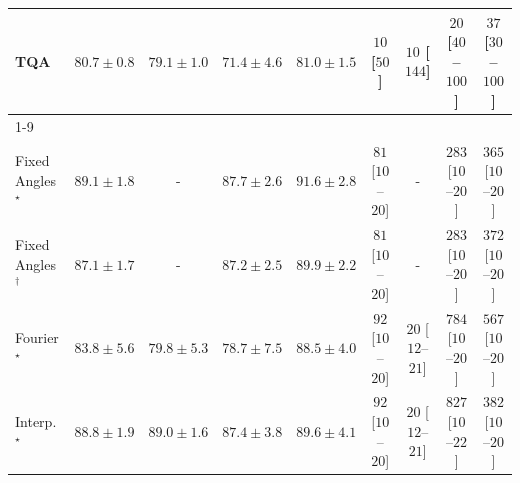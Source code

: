 \begin{tabular}{l|cccc|cccc|}
TQA & {\cellcolor[HTML]{2D914B}} \color[HTML]{F1F1F1} $80.7\pm 0.8$ & {\cellcolor[HTML]{379E54}} \color[HTML]{F1F1F1} $79.1\pm 1.0$ & {\cellcolor[HTML]{88CD7F}} \color[HTML]{000000} $71.4\pm 4.6$ & {\cellcolor[HTML]{2B8E4A}} \color[HTML]{F1F1F1} $81.0\pm 1.5$ & {\cellcolor[HTML]{FFF7F3}} \color[HTML]{000000} $10$ [$50$] & {\cellcolor[HTML]{FFF7F3}} \color[HTML]{000000} $10$ [$144$] & {\cellcolor[HTML]{FFF4F0}} \color[HTML]{000000} $20$ [$40$--$100$] & {\cellcolor[HTML]{FEF1ED}} \color[HTML]{000000} $37$ [$30$--$100$] \\
\cline{1-9}
\multicolumn{9}{c}{\rule{0pt}{8pt}SV} \\
\midrule
Fixed Angles$^\star$ & {\cellcolor[HTML]{034A74}} \color[HTML]{F1F1F1} $89.1\pm 1.8$ & {\cellcolor[HTML]{000000}} \color[HTML]{F1F1F1} {\cellcolor{white}} \color{black} - & {\cellcolor[HTML]{045483}} \color[HTML]{F1F1F1} $87.7\pm 2.6$ & {\cellcolor[HTML]{023858}} \color[HTML]{F1F1F1} $91.6\pm 2.8$ & {\cellcolor[HTML]{FEE6E3}} \color[HTML]{000000} $81$ [$10$--$20$] & {\cellcolor[HTML]{000000}} \color[HTML]{F1F1F1} {\cellcolor{white}} \color{black} - & {\cellcolor[HTML]{FBAAB8}} \color[HTML]{000000} $283$ [$10$--$20$] & {\cellcolor[HTML]{F984AB}} \color[HTML]{F1F1F1} $365$ [$10$--$20$] \\
Fixed Angles$^\dagger$ & {\cellcolor[HTML]{04588A}} \color[HTML]{F1F1F1} $87.1\pm 1.7$ & {\cellcolor[HTML]{000000}} \color[HTML]{F1F1F1} {\cellcolor{white}} \color{black} - & {\cellcolor[HTML]{04588A}} \color[HTML]{F1F1F1} $87.2\pm 2.5$ & {\cellcolor[HTML]{03446A}} \color[HTML]{F1F1F1} $89.9\pm 2.2$ & {\cellcolor[HTML]{FEE6E3}} \color[HTML]{000000} $81$ [$10$--$20$] & {\cellcolor[HTML]{000000}} \color[HTML]{F1F1F1} {\cellcolor{white}} \color{black} - & {\cellcolor[HTML]{FBAAB8}} \color[HTML]{000000} $283$ [$10$--$20$] & {\cellcolor[HTML]{F881AA}} \color[HTML]{F1F1F1} $372$ [$10$--$20$] \\
Fourier$^\star$ & {\cellcolor[HTML]{0569A4}} \color[HTML]{F1F1F1} $83.8\pm 5.6$ & {\cellcolor[HTML]{1E80B8}} \color[HTML]{F1F1F1} $79.8\pm 5.3$ & {\cellcolor[HTML]{2A88BC}} \color[HTML]{F1F1F1} $78.7\pm 7.5$ & {\cellcolor[HTML]{034E7B}} \color[HTML]{F1F1F1} $88.5\pm 4.0$ & {\cellcolor[HTML]{FDE4E1}} \color[HTML]{000000} $92$ [$10$--$20$] & {\cellcolor[HTML]{FFF4F0}} \color[HTML]{000000} $20$ [$12$--$21$] & {\cellcolor[HTML]{5D006F}} \color[HTML]{F1F1F1} $784$ [$10$--$20$] & {\cellcolor[HTML]{C71D8C}} \color[HTML]{F1F1F1} $567$ [$10$--$20$] \\
Interp.$^\star$ & {\cellcolor[HTML]{034C78}} \color[HTML]{F1F1F1} $88.8\pm 1.9$ & {\cellcolor[HTML]{034A74}} \color[HTML]{F1F1F1} $89.0\pm 1.6$ & {\cellcolor[HTML]{045687}} \color[HTML]{F1F1F1} $87.4\pm 3.8$ & {\cellcolor[HTML]{03466E}} \color[HTML]{F1F1F1} $89.6\pm 4.1$ & {\cellcolor[HTML]{FDE4E1}} \color[HTML]{000000} $92$ [$10$--$20$] & {\cellcolor[HTML]{FFF4F0}} \color[HTML]{000000} $20$ [$12$--$21$] & {\cellcolor[HTML]{49006A}} \color[HTML]{F1F1F1} $827$ [$10$--$22$] & {\cellcolor[HTML]{F87AA8}} \color[HTML]{F1F1F1} $382$ [$10$--$20$] \\

\end{tabular}
